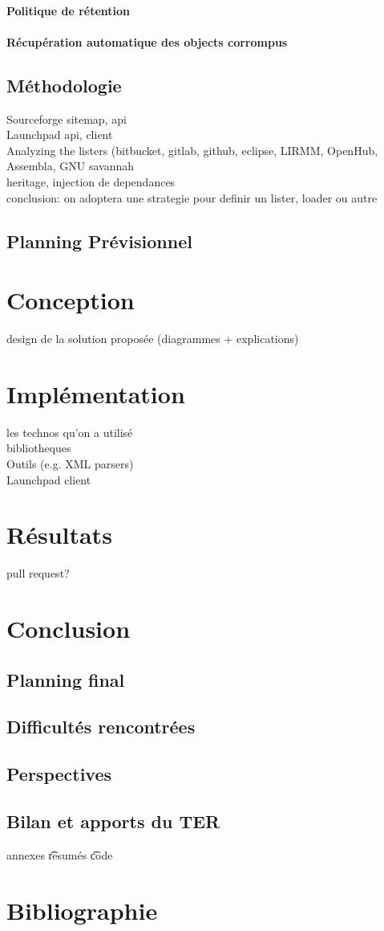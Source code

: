 \documentclass[12pt,a4paper]{report}
\begin{document}
		\subsubsection{Politique de rétention}
		\subsubsection{Récupération automatique des objects corrompus}
\section{Méthodologie}		
	Sourceforge sitemap, api\\
	Launchpad api, client\\
	Analyzing the listers (bitbucket, gitlab, github, eclipse, LIRMM, OpenHub, 			Assembla, GNU savannah\\
	heritage, injection de dependances\\
	conclusion: on adoptera une strategie pour definir un lister, loader ou autre\\
\section{Planning Prévisionnel}
\chapter{Conception}
	design de la solution proposée (diagrammes + explications)
\chapter{Implémentation}
	les technos qu'on a utilisé\\
	bibliotheques\\
	Outils (e.g. XML parsers)\\
	Launchpad client
	
\chapter{Résultats}
	pull request?
\chapter{Conclusion}
	\section{Planning final}
	\section{Difficultés rencontrées}
	\section{Perspectives}
	\section{Bilan et apports du TER}	
annexes\n
\t resumés \t code	
\chapter*{Bibliographie}
\end{document}
